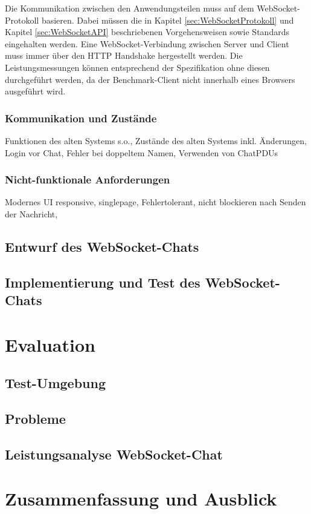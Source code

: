 \documentclass[11pt,a4paper,titlepage]{scrartcl}
\numberwithin{equation}{section}
\begin{document}
\noindent Die Kommunikation zwischen den Anwendungsteilen muss auf dem WebSocket-Protokoll basieren. Dabei müssen die in Kapitel \ref{sec:WebSocketProtokoll} und Kapitel \ref{sec:WebSocketAPI} beschriebenen Vorgehensweisen sowie Standards eingehalten werden. Eine WebSocket-Verbindung zwischen Server und Client muss immer über den HTTP Handshake hergestellt werden. Die Leistungsmessungen können entsprechend der Spezifikation ohne diesen durchgeführt werden, da der Benchmark-Client nicht innerhalb eines Browsers ausgeführt wird. 

\subsubsection*{Kommunikation und Zustände}

Funktionen des alten Systems s.o., Zustände des alten Systems inkl. Änderungen,  Login vor Chat, Fehler bei doppeltem Namen, Verwenden von ChatPDUs

\subsubsection{Nicht-funktionale Anforderungen}
Modernes UI responsive, singlepage, Fehlertolerant, nicht blockieren nach Senden der Nachricht, 
\subsection{Entwurf des WebSocket-Chats}
\subsection{Implementierung und Test des WebSocket-Chats}

\section{Evaluation}
\subsection{Test-Umgebung}
\subsection{Probleme}
\subsection{Leistungsanalyse WebSocket-Chat}

\section{Zusammenfassung und Ausblick}
\end{document}
